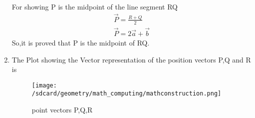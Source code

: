 \documentclass{article}
\begin{document}
\begin{enumerate}
    For showing P is the midpoint of the line segment RQ
    \begin{align}
        \Vec{P}=\frac{R+Q}{2}\\
        \Vec{P}=2\vec{a}+\vec{b}
    \end{align}
    So,it is proved that P is the midpoint of RQ.
    \item The Plot showing the Vector representation of the position vectors P,Q and R is
    \begin{figure}[!ht]
        \centering
        \texttt{[image: /sdcard/geometry/math\_computing/mathconstruction.png]}
        \caption{point vectors P,Q,R}
        \label{fig:enter-label}
    \end{figure}
\end{enumerate}
\end{document}
